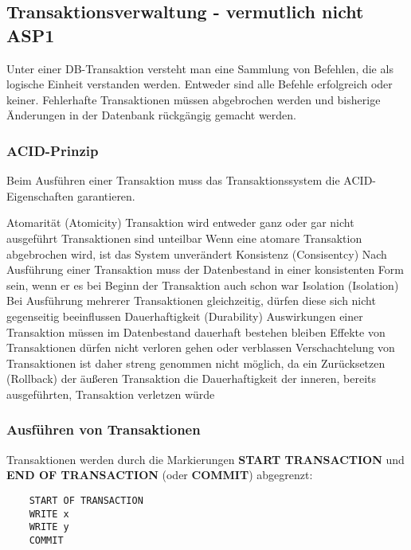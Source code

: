 \documentclass[asp1.tex]{subfiles}
\begin{document}
\subsection{Transaktionsverwaltung - vermutlich nicht ASP1}
Unter einer DB-Transaktion versteht man eine Sammlung von Befehlen, die als logische Einheit verstanden werden.
Entweder sind alle Befehle erfolgreich oder keiner.
Fehlerhafte Transaktionen müssen abgebrochen werden und bisherige Änderungen in der Datenbank rückgängig gemacht werden.

\subsubsection{ACID-Prinzip}
Beim Ausführen einer Transaktion muss das Transaktionssystem die ACID-Eigenschaften garantieren.

\begin{outline}
    \1 Atomarität (Atomicity)
    \2 Transaktion wird entweder ganz oder gar nicht ausgeführt
    \2 Transaktionen sind unteilbar
    \2 Wenn eine atomare Transaktion abgebrochen wird, ist das System unverändert
    \1 Konsistenz (Consisentcy)
    \2 Nach Ausführung einer Transaktion muss der Datenbestand in einer konsistenten Form sein, wenn er es bei Beginn der Transaktion auch schon war
    \1 Isolation (Isolation)
    \2 Bei Ausführung mehrerer Transaktionen gleichzeitig, dürfen diese sich nicht gegenseitig beeinflussen
    \1 Dauerhaftigkeit (Durability)
    \2 Auswirkungen einer Transaktion müssen im Datenbestand dauerhaft bestehen bleiben
    \2 Effekte von Transaktionen dürfen nicht verloren gehen oder verblassen
    \2 Verschachtelung von Transaktionen ist daher streng genommen nicht möglich, da ein Zurücksetzen (Rollback) der äußeren Transaktion die Dauerhaftigkeit der inneren, bereits ausgeführten, Transaktion verletzen würde
\end{outline}

\subsubsection{Ausführen von Transaktionen}

Transaktionen werden durch die Markierungen \textbf{START TRANSACTION} und \textbf{END OF TRANSACTION} (oder \textbf{COMMIT}) abgegrenzt:

\begin{lstlisting}
    START OF TRANSACTION
    WRITE x
    WRITE y
    COMMIT
\end{lstlisting}
\end{document}

